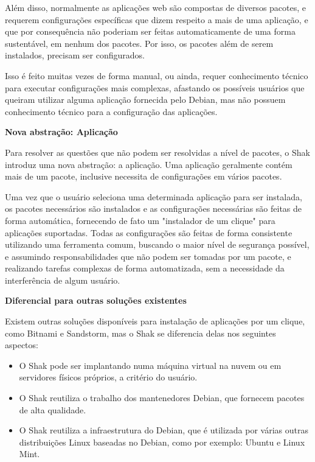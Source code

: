 Além disso, normalmente as aplicações web são compostas de diversos pacotes, e
requerem configurações específicas que dizem respeito a mais de uma aplicação,
e que por consequência não poderiam ser feitas automaticamente de uma forma sustentável, 
em nenhum dos pacotes. Por isso, os pacotes além de serem instalados, precisam ser configurados.

Isso é feito muitas vezes de forma manual, ou ainda, requer conhecimento técnico
para executar configurações mais complexas, afastando os possíveis usuários
que queiram utilizar alguma aplicação fornecida pelo Debian, mas não possuem
conhecimento técnico para a configuração das aplicações.

\textbf{Nova abstração: Aplicação}

Para resolver as questões que não podem ser resolvidas a nível de pacotes, o
Shak introduz uma nova abstração: a aplicação. Uma aplicação geralmente
contém mais de um pacote, inclusive necessita de configurações em vários pacotes.

Uma vez que o usuário seleciona uma determinada aplicação para
ser instalada, os pacotes necessários são instalados e as configurações
necessárias são feitas de forma automática, fornecendo de fato um "instalador
de um clique" para aplicações suportadas. Todas as configurações são feitas de
forma consistente utilizando uma ferramenta comum, buscando o maior nível de
segurança possível, e assumindo responsabilidades que não podem ser tomadas por
um pacote, e realizando tarefas complexas de forma automatizada, sem a necessidade
da interferência de algum usuário.

\textbf{Diferencial para outras soluções existentes}

Existem outras soluções disponíveis para instalação de aplicações por um clique,
como Bitnami e Sandstorm, mas o Shak se
diferencia delas nos seguintes aspectos:

\begin{itemize}
  \item O Shak pode ser implantando numa máquina virtual na nuvem ou em servidores físicos
    próprios, a critério do usuário.

  \item O Shak reutiliza o trabalho dos mantenedores Debian, que fornecem pacotes
    de alta qualidade.

  \item O Shak reutiliza a infraestrutura do Debian, que é utilizada por várias
outras distribuições Linux baseadas no Debian, como por exemplo: Ubuntu e Linux Mint.

\end{itemize}

